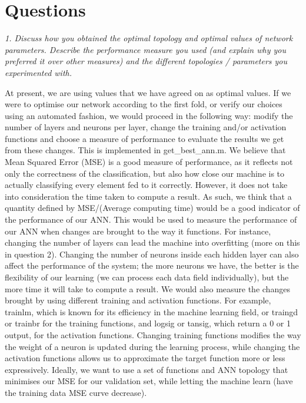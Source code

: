 \documentclass[a4wide, 11pt]{article}
\begin{document}
\section{Questions}
\textit{1. Discuss how you obtained the optimal topology and optimal values of network parameters. Describe the performance measure you used (and explain why you preferred it over other measures) and the different topologies / parameters you experimented with.}

At present, we are using values that we have agreed on as optimal values. If we were to optimise our network according to the first fold, or verify our choices using an automated fashion, we would proceed in the following way: modify the number of layers and neurons per layer, change the training and/or activation functions and choose a measure of performance to evaluate the results we get from these changes. This is implemented in get\_best\_ann.m.
We believe that Mean Squared Error (MSE) is a good measure of performance, as it reflects not only the correctness of the classification, but also how close our machine is to actually classifying every element fed to it correctly. However, it does not take into consideration the time taken to compute a result. As such, we think that a quantity defined by MSE/(Average computing time) would be a good indicator of the performance of our ANN.
This would be used to measure the performance of our ANN when changes are brought to the way it functions. For instance, changing the number of layers can lead the machine into overfitting (more on this in question 2). Changing the number of neurons inside each hidden layer can also affect the performance of the system; the more neurons we have, the better is the flexibility of our learning (we can process each data field individually), but the more time it will take to compute a result. We would also measure the changes brought by using different training and activation functions. For example, trainlm, which is known for its efficiency in the machine learning field, or traingd or trainbr for the training functions, and logsig or tansig, which return a 0 or 1 output, for the activation functions. Changing training functions modifies the way the weight of a neuron is updated during the learning process, while changing the activation functions allows us to approximate the target function more or less expressively. Ideally, we want to use a set of functions and ANN topology that minimises our MSE for our validation set, while letting the machine learn (have the training data MSE curve decrease).
\end{document}
